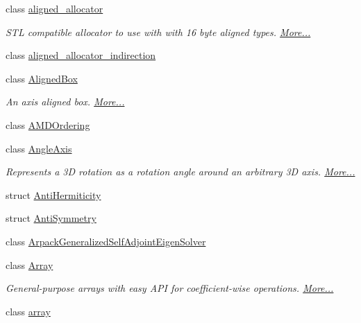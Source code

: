 \begin{DoxyCompactItemize}
\item 
class \hyperlink{group___core___module_class_eigen_1_1aligned__allocator}{aligned\+\_\+allocator}
\begin{DoxyCompactList}\small\item\em S\+TL compatible allocator to use with with 16 byte aligned types.  \hyperlink{group___core___module_class_eigen_1_1aligned__allocator}{More...}\end{DoxyCompactList}\item 
class \hyperlink{class_eigen_1_1aligned__allocator__indirection}{aligned\+\_\+allocator\+\_\+indirection}
\item 
class \hyperlink{group___geometry___module_class_eigen_1_1_aligned_box}{Aligned\+Box}
\begin{DoxyCompactList}\small\item\em An axis aligned box.  \hyperlink{group___geometry___module_class_eigen_1_1_aligned_box}{More...}\end{DoxyCompactList}\item 
class \hyperlink{group___ordering_methods___module_class_eigen_1_1_a_m_d_ordering}{A\+M\+D\+Ordering}
\item 
class \hyperlink{group___geometry___module_class_eigen_1_1_angle_axis}{Angle\+Axis}
\begin{DoxyCompactList}\small\item\em Represents a 3D rotation as a rotation angle around an arbitrary 3D axis.  \hyperlink{group___geometry___module_class_eigen_1_1_angle_axis}{More...}\end{DoxyCompactList}\item 
struct \hyperlink{struct_eigen_1_1_anti_hermiticity}{Anti\+Hermiticity}
\item 
struct \hyperlink{struct_eigen_1_1_anti_symmetry}{Anti\+Symmetry}
\item 
class \hyperlink{class_eigen_1_1_arpack_generalized_self_adjoint_eigen_solver}{Arpack\+Generalized\+Self\+Adjoint\+Eigen\+Solver}
\item 
class \hyperlink{group___core___module_class_eigen_1_1_array}{Array}
\begin{DoxyCompactList}\small\item\em General-\/purpose arrays with easy A\+PI for coefficient-\/wise operations.  \hyperlink{group___core___module_class_eigen_1_1_array}{More...}\end{DoxyCompactList}\item 
class \hyperlink{class_eigen_1_1array}{array}

\end{DoxyCompactItemize}
